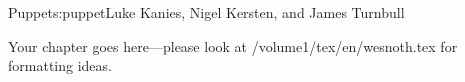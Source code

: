 \begin{aosachapter}{Puppet}{s:puppet}{Luke Kanies, Nigel Kersten, and James Turnbull}

Your chapter goes here---please look at /volume1/tex/en/wesnoth.tex for 
formatting ideas.

\end{aosachapter}
